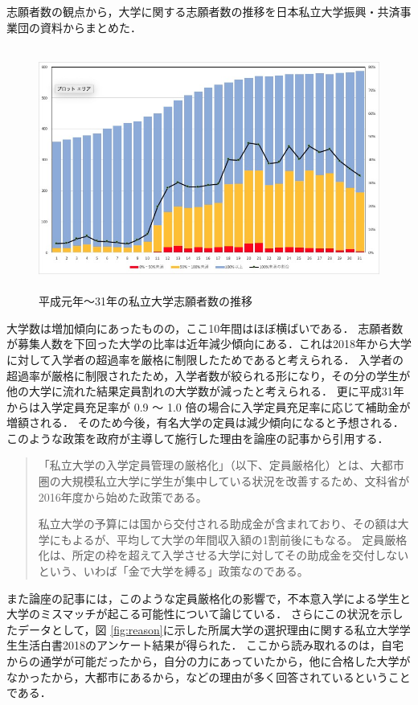 志願者数の観点から，大学に関する志願者数の推移を日本私立大学振興・共済事業団の資料\cite{shigan}からまとめた．
\begin{figure}[H]
\centering
\includegraphics[height=8cm]{images/shigansya.jpg}
\caption{平成元年〜31年の私立大学志願者数の推移}
\label{fig:shigan}
\end{figure}
大学数は増加傾向にあったものの，ここ10年間はほぼ横ばいである．
志願者数が募集人数を下回った大学の比率は近年減少傾向にある．これは2018年から大学に対して入学者の超過率を厳格に制限\cite{hojokin1}したためであると考えられる．
入学者の超過率が厳格に制限されたため，入学者数が絞られる形になり，その分の学生が他の大学に流れた結果定員割れの大学数が減ったと考えられる．
更に平成31年からは入学定員充足率が 0.9 〜 1.0 倍の場合に入学定員充足率に応じて補助金が増額される\cite{hojokin2}．
そのため今後，有名大学の定員は減少傾向になると予想される．
このような政策を政府が主導して施行した理由を論座の記事\cite{ronza}から引用する．
\begin{quotation}
「私立大学の入学定員管理の厳格化」（以下、定員厳格化）とは、大都市圏の大規模私立大学に学生が集中している状況を改善するため、文科省が2016年度から始めた政策である。

私立大学の予算には国から交付される助成金が含まれており、その額は大学にもよるが、平均して大学の年間収入額の1割前後にもなる。
定員厳格化は、所定の枠を超えて入学させる大学に対してその助成金を交付しないという、いわば「金で大学を縛る」政策なのである。
\end{quotation}
また論座の記事には，このような定員厳格化の影響で，不本意入学による学生と大学のミスマッチが起こる可能性について論じている．
さらにこの状況を示したデータとして，図 \ref{fig:reason}に示した所属大学の選択理由に関する私立大学学生生活白書2018\cite{reason}のアンケート結果が得られた．
ここから読み取れるのは，自宅からの通学が可能だったから，自分の力にあっていたから，他に合格した大学がなかったから，大都市にあるから，などの理由が多く回答されているということである．
